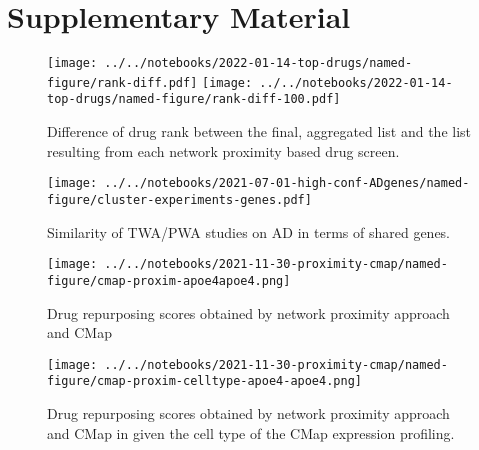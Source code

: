 \documentclass[letterpaper]{article}
\begin{document}


\newpage
\section*{Supplementary Material}

\setcounter{table}{0}
\makeatletter 
\renewcommand{\figurename}{Supplementary Table} %
\makeatother

\setcounter{figure}{0}
\makeatletter 
\renewcommand{\figurename}{Supplementary Figure} %
\makeatother

\begin{figure}[p]
\texttt{[image: ../../notebooks/2022-01-14-top-drugs/named-figure/rank-diff.pdf]}
\texttt{[image: ../../notebooks/2022-01-14-top-drugs/named-figure/rank-diff-100.pdf]}
\caption{
Difference of drug rank between the final, aggregated list and the list
resulting from each network proximity based drug screen.
}
\label{fig:rank-diff}
\end{figure}


\begin{figure}
\texttt{[image: ../../notebooks/2021-07-01-high-conf-ADgenes/named-figure/cluster-experiments-genes.pdf]}
\caption{
Similarity of TWA/PWA studies on AD in terms of shared genes.
}
\label{fig:twas-clustermap}
\end{figure}

\begin{figure}[p]
\texttt{[image: ../../notebooks/2021-11-30-proximity-cmap/named-figure/cmap-proxim-apoe4apoe4.png]}
\caption{
Drug repurposing scores obtained by network proximity approach and CMap
}
\label{fig:proxim-cmap}
\end{figure}

\begin{figure}[p]
\texttt{[image: ../../notebooks/2021-11-30-proximity-cmap/named-figure/cmap-proxim-celltype-apoe4-apoe4.png]}
\caption{
Drug repurposing scores obtained by network proximity approach and CMap in
given the cell type of the CMap expression profiling.
}
\label{fig:proxim-cmap-celltype}
\end{figure}
\end{document}
